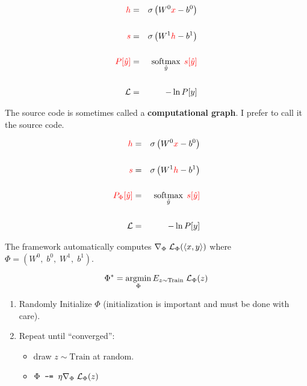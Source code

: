 {

\begin{eqnarray*}
  {\color{red} h} & = & \sigma\left(W^0{\color{red} x} - b^0\right) \\
  \\
  {\color{red} s} & = & \sigma\left(W^1{\color{red} h} - b^1 \right) \\
  \\
  {\color{red} P[\hat{y}]} & = & \operatorname*{softmax}_{\hat{y}}\;{\color{red} s[\hat{y}]} \\
  \\
  {\cal L} & = & - \ln P[y]
\end{eqnarray*}

\vfill
The source code is sometimes called a {\bf computational graph}.  I prefer to call it the source code.


\begin{eqnarray*}
  {\color{red} h} & = & \sigma\left(W^0{\color{red} x} - b^0\right) \\
  \\
  {\color{red} s} & = & \sigma\left(W^1{\color{red} h} - b^1 \right) \\
  \\
  {\color{red} P_\Phi[\hat{y}]} & = & \operatorname*{softmax}_{\hat{y}}\;{\color{red} s[\hat{y}]} \\
  \\
  {\cal L} & = & - \ln P[y]
\end{eqnarray*}

\vfill
The framework automatically computes $\nabla_\Phi \; {\cal L}_\Phi({\mbox{$\langle x,y\rangle$}})$
where $\Phi = (W^0,\;b^0,\;W^1,\;b^1)$.


$$\Phi^* = \operatorname*{argmin}_\Phi E_{z \sim \mathrm{Train}} \; {\cal L}_\Phi(z)$$

\vfill
\begin{enumerate}
\item Randomly Initialize $\Phi$ (initialization is important and must be done with care).

  \vfill
  \item Repeat until ``converged'':

    \vfill
    \begin{itemize}
    \item draw $z \sim \mathrm{Train}$ at random.
      \vfill
    \item {\color{red} $\Phi \;\;\mbox{\tt -=}\;\; \eta \nabla_\Phi\;{\cal L}_\Phi(z)$}
    \end{itemize}
\end{enumerate}

}
